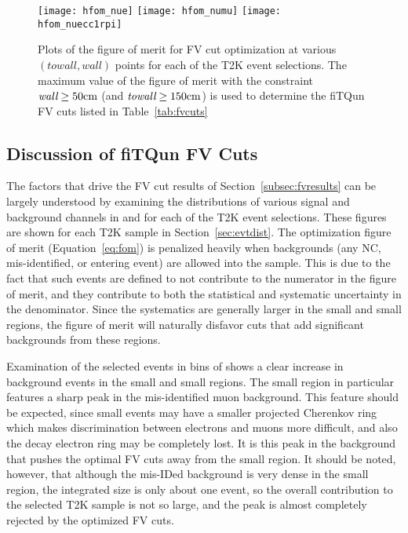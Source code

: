 \begin{figure}[h]
  \begin{center}
    \texttt{[image: hfom\_nue]}
    \texttt{[image: hfom\_numu]}
    \texttt{[image: hfom\_nuecc1rpi]}
  \end{center}
  \caption{Plots of the figure of merit for FV cut optimization at various
  $(towall,wall)$ points for each of the T2K event selections. The maximum value of the figure of merit with the
  constraint $\emph{wall} \geq 50 \text{cm}$ (and $\emph{towall} \geq 150 \text{cm}$) is used to determine the fiTQun FV cuts listed in
  Table~\ref{tab:fvcuts}}
  \label{fig:fom}
\end{figure}



\subsection{Discussion of fiTQun FV Cuts}
\label{subsec:fvdiscuss}

The factors that drive the FV cut results of Section~\ref{subsec:fvresults} can
be largely understood by examining the distributions of various signal
and background channels in \wall and \towall for each of the T2K event
selections.  These figures are shown for each T2K sample in Section~\ref{sec:evtdist}.
The optimization figure of merit (Equation~\ref{eq:fom}) is
penalized heavily when backgrounds (any NC, mis-identified, or entering event)
are allowed into the sample.  This is due to the fact that such events are
defined to not contribute to the numerator in the figure of merit, and they
contribute to both the statistical and systematic uncertainty in the
denominator. Since the systematics are generally larger in the
small \wall and small \towall regions, the figure of merit will naturally
disfavor cuts that add significant backgrounds from these regions.  

Examination of the selected \nue events in bins of \towall shows a clear
increase in background events in the small \towall and small \wall regions.
The small \towall region in particular features a sharp peak in the
mis-identified muon background.  This feature should be expected, since small
\towall events may have a smaller projected Cherenkov ring which makes
discrimination between electrons and muons more difficult, and also the decay
electron ring may be completely lost. It is this peak in the background that pushes
the optimal FV cuts away from the small \towall region.  It should be noted,
however, that although the mis-IDed background is very dense in the small
\towall region, the integrated size is only about one event, so the overall
contribution to the selected \nue T2K sample is not so large, and the peak
is almost completely rejected by the optimized FV cuts.

